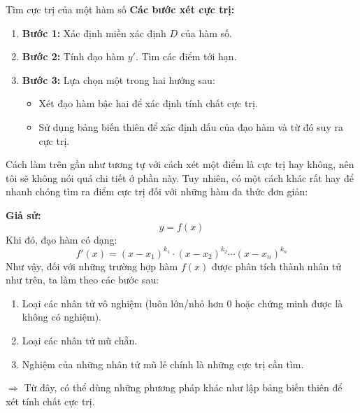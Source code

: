 \begin{lythuyetbox}{Tìm cực trị của một hàm số}
\textbf{Các bước xét cực trị:}
\begin{enumerate}
    \item \textbf{Bước 1:} Xác định miền xác định $D$ của hàm số.
    \item \textbf{Bước 2:} Tính đạo hàm $y'$. Tìm các điểm tới hạn.
    \item \textbf{Bước 3:} Lựa chọn một trong hai hướng sau:
    \begin{itemize}
        \item Xét đạo hàm bậc hai để xác định tính chất cực trị.
        \item Sử dụng bảng biến thiên để xác định dấu của đạo hàm và từ đó suy ra cực trị.
    \end{itemize}

\end{enumerate}

Cách làm trên gần như tương tự với cách xét một điểm là cực trị hay không, nên tôi sẽ không nói quá chi tiết ở phần này. Tuy nhiên, có một cách khác rất hay để nhanh chóng tìm ra điểm cực trị đối với những hàm đa thức đơn giản:

\textbf{Giả sử:}
\[
    y = f(x)
\]
Khi đó, đạo hàm có dạng:
\[
    f'(x) = (x - x_1)^{k_1} \cdot (x - x_2)^{k_2} \cdots (x - x_n)^{k_n}
\]
Như vậy, đối với những trường hợp hàm $f(x)$ được phân tích thành nhân tử như trên, ta làm theo các bước sau:
\begin{enumerate}
    \item Loại các nhân tử vô nghiệm (luôn lớn/nhỏ hơn 0 hoặc chứng minh được là không có nghiệm).
    \item Loại các nhân tử mũ chẵn.
    \item Nghiệm của những nhân tử mũ lẻ chính là những cực trị cần tìm. 
\end{enumerate}

\vspace{0.5em}
\noindent
$\Rightarrow$ Từ đây, có thể dùng những phương pháp khác như lập bảng biến thiên để xét tính chất cực trị.


\end{lythuyetbox}
